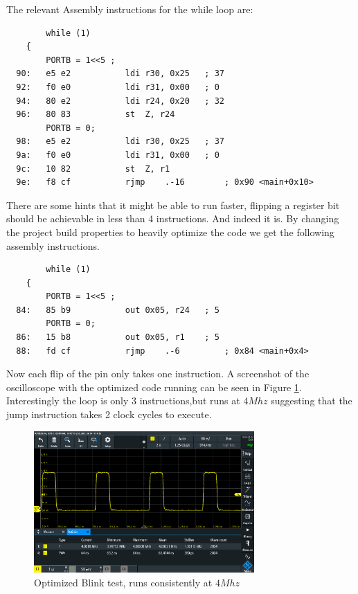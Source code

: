 \documentclass{article}
\begin{document}
The relevant Assembly instructions for the while loop are:

\begin{verbatim}
    	while (1)
	{
		PORTB = 1<<5 ;
  90:	e5 e2       	ldi	r30, 0x25	; 37
  92:	f0 e0       	ldi	r31, 0x00	; 0
  94:	80 e2       	ldi	r24, 0x20	; 32
  96:	80 83       	st	Z, r24
		PORTB = 0;
  98:	e5 e2       	ldi	r30, 0x25	; 37
  9a:	f0 e0       	ldi	r31, 0x00	; 0
  9c:	10 82       	st	Z, r1
  9e:	f8 cf       	rjmp	.-16     	; 0x90 <main+0x10>

\end{verbatim}
There are some hints that it might be able to run faster, flipping a register bit should be achievable in less than 4 instructions. And indeed it is. By changing the project build properties to heavily optimize the code we get the following assembly instructions.

\begin{verbatim}
    	while (1)
	{
		PORTB = 1<<5 ;
  84:	85 b9       	out	0x05, r24	; 5
		PORTB = 0;
  86:	15 b8       	out	0x05, r1	; 5
  88:	fd cf       	rjmp	.-6      	; 0x84 <main+0x4>
\end{verbatim}

Now each flip of the pin only takes one instruction. A screenshot of the oscilloscope with the optimized code running can be seen in Figure \ref{hw1:fig:optimized}. Interestingly the loop is only 3 instructions,but runs at $4 Mhz$ suggesting that the jump instruction takes 2 clock cycles to execute.  

\begin{figure}[h!]
    \centering
    \includegraphics[width=0.75\textwidth]{HW1/OptimizedBLink.PNG}
    \caption{Optimized Blink test, runs consistently at $4 Mhz$}
    \label{hw1:fig:optimized}
\end{figure}

\newpage
\end{document}
